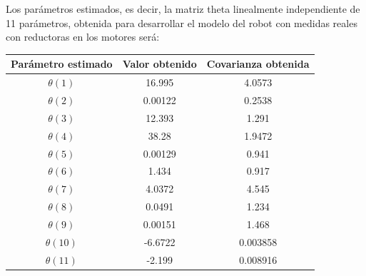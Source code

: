 Los parámetros estimados, es decir, la matriz theta linealmente independiente de 11 parámetros, obtenida para desarrollar el modelo del robot con medidas reales con reductoras en los motores será:

\begin{center}
	
	\begin{tabular}{| c | c | c |}
		
		
		
		\hline
		
		Parámetro estimado & Valor obtenido & Covarianza obtenida \\
		
		\hline
		
		$\theta(1) $ & 16.995 & 4.0573 \\
		
		\hline
		
		$\theta(2) $ & 0.00122 & 0.2538 \\
		
		\hline
		
		$\theta(3) $ & 12.393 & 1.291 \\
		
		\hline
		
		$\theta(4) $ & 38.28 & 1.9472 \\
		
		\hline
		
		$\theta(5) $ & 0.00129 & 0.941 \\
		
		\hline
		
		$\theta(6) $ & 1.434 & 0.917 \\
		
		\hline
		
		$\theta(7) $ & 4.0372 & 4.545 \\
		
		\hline
		
		$\theta(8) $ & 0.0491 & 1.234 \\
		
		\hline
		
		$\theta(9) $ & 0.00151 & 1.468 \\
		
		\hline
		
		$\theta(10) $ & -6.6722 & 0.003858 \\
		
		\hline
		
		$\theta(11) $ & -2.199 & 0.008916 \\
		
		\hline
		
	\end{tabular}
	
\end{center}

